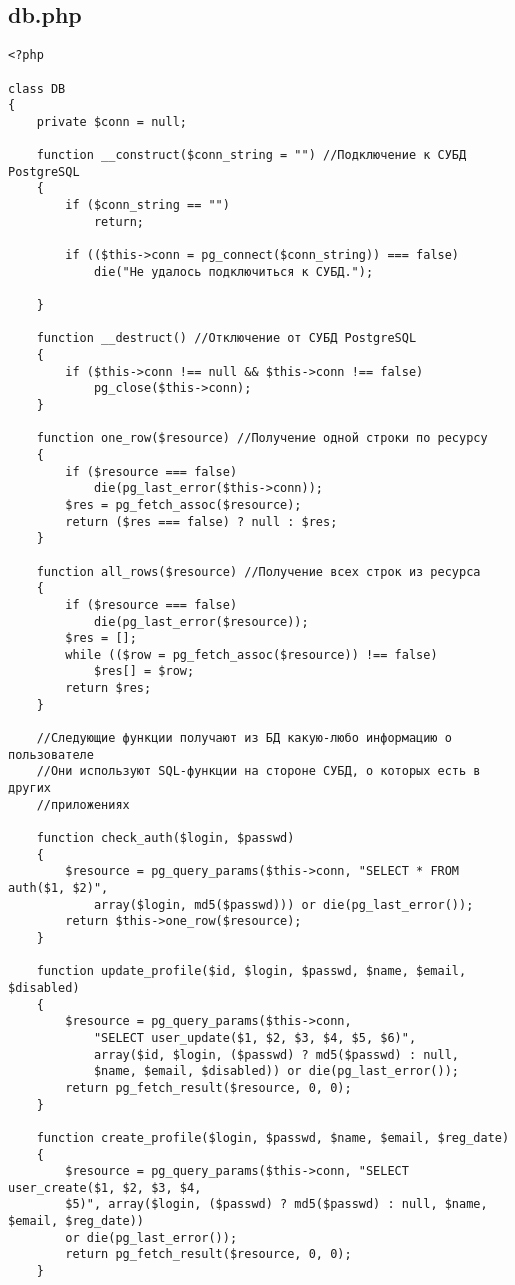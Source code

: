 \documentclass[a4paper]{article}
\begin{document}
\subsection{db.php}
\begin{verbatim}
<?php

class DB
{
    private $conn = null;

    function __construct($conn_string = "") //Подключение к СУБД PostgreSQL
    {
        if ($conn_string == "")
            return;

        if (($this->conn = pg_connect($conn_string)) === false)
            die("Не удалось подключиться к СУБД.");

    }

    function __destruct() //Отключение от СУБД PostgreSQL
    {
        if ($this->conn !== null && $this->conn !== false)
            pg_close($this->conn);
    }

    function one_row($resource) //Получение одной строки по ресурсу
    {
        if ($resource === false)
            die(pg_last_error($this->conn));
        $res = pg_fetch_assoc($resource);
        return ($res === false) ? null : $res;
    }

    function all_rows($resource) //Получение всех строк из ресурса
    {
        if ($resource === false)
            die(pg_last_error($resource));
        $res = [];
        while (($row = pg_fetch_assoc($resource)) !== false)
            $res[] = $row;
        return $res;
    }
    
    //Следующие функции получают из БД какую-любо информацию о пользователе
    //Они используют SQL-функции на стороне СУБД, о которых есть в других
    //приложениях    
    
    function check_auth($login, $passwd)
    {
        $resource = pg_query_params($this->conn, "SELECT * FROM auth($1, $2)",
            array($login, md5($passwd))) or die(pg_last_error());
        return $this->one_row($resource);
    }

    function update_profile($id, $login, $passwd, $name, $email, $disabled)
    {
        $resource = pg_query_params($this->conn,
            "SELECT user_update($1, $2, $3, $4, $5, $6)",
            array($id, $login, ($passwd) ? md5($passwd) : null,
            $name, $email, $disabled)) or die(pg_last_error());
        return pg_fetch_result($resource, 0, 0);
    }

    function create_profile($login, $passwd, $name, $email, $reg_date)
    {
        $resource = pg_query_params($this->conn, "SELECT user_create($1, $2, $3, $4,
        $5)", array($login, ($passwd) ? md5($passwd) : null, $name, $email, $reg_date))
        or die(pg_last_error());
        return pg_fetch_result($resource, 0, 0);
    }


\end{verbatim}
\end{document}
